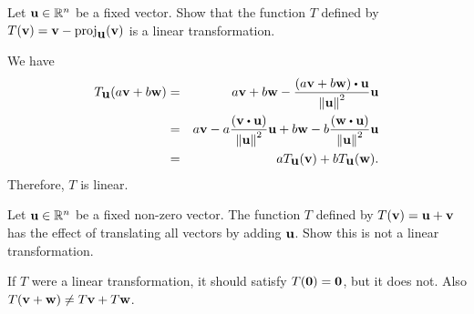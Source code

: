 \begin{ex}
  Let $\mbox{\bf u}\in\mathbb{R}^n$ be a fixed vector.  Show that the function $T$
  defined by
  $T(\vect{v}) = \vect{v}-\proj_{\vect{u}}(\vect{v})$ is a
  linear transformation.
  \begin{sol}
    We have
    \begin{eqnarray*}
      T_{\vect{u}}(a\vect{v}+b\vect{w})
      &=& a\vect{v}+b\vect{w}
          -\frac{(a\vect{v}+b\vect{w})\dotprod\vect{u}}{\norm{\vect{u}}^{2}}
          \vect{u} \\
      &=& a\vect{v}
          -a\frac{(\vect{v}\dotprod\vect{u})}{\norm{\vect{u}}^{2}}\vect{u}
          +b\vect{w}
          -b\frac{(\vect{w}\dotprod\vect{u})}{\norm{\vect{u}}^{2}}\vect{u} \\
      &=& aT_{\vect{u}}(\vect{v}) +bT_{\vect{u}}(\vect{w}).
    \end{eqnarray*}
    Therefore, $T$ is linear.
  \end{sol}
\end{ex}

\begin{ex}
  Let $\mbox{\bf u}\in\mathbb{R}^n$ be a fixed non-zero vector. The function $T$
  defined by $T(\mbox{\bf v})=\mbox{\bf u}+\mbox{\bf v}$ has the effect of
  translating all vectors by adding $\mbox{\bf u}$. Show this is not a
  linear transformation. 
  \begin{sol}
    If $T$ were a linear transformation, it should satisfy
    $T(\mbox{\bf 0}) = \mbox{\bf 0}$, but it does not. Also
    $T(\mbox{\bf v}+\mbox{\bf w}) \neq T\mbox{\bf v}+T\mbox{\bf w}$.
  \end{sol}
\end{ex}

